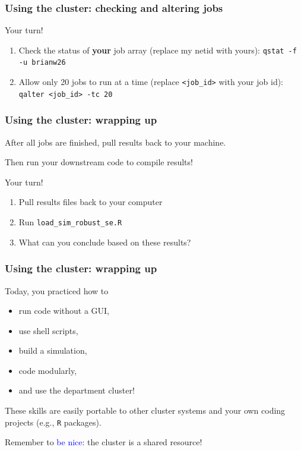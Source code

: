 \documentclass[12pt, 
hyperref={colorlinks=true, linkcolor=BlueViolet, urlcolor=BlueViolet},dvipsnames]{beamer}
\begin{document}
\begin{frame}
\frametitle{Using the cluster: checking and altering jobs}

Your turn!

\begin{enumerate}
\item Check the status of \textbf{your} job array (replace my netid with yours): \texttt{qstat -f -u brianw26}
\item Allow only 20 jobs to run at a time (replace \texttt{<job\_id>} with your job id): \texttt{qalter <job\_id> -tc 20}
\end{enumerate}
\end{frame}

\begin{frame}
\frametitle{Using the cluster: wrapping up}
After all jobs are finished, pull results back to your machine. \pause

Then run your downstream code to compile results! \pause

Your turn! \vspace{-0.3cm}
\begin{enumerate}
\item Pull results files back to your computer
\item Run \texttt{load\_sim\_robust\_se.R}
\item What can you conclude based on these results?
\end{enumerate}
\end{frame}

\begin{frame}
\frametitle{Using the cluster: wrapping up}
Today, you practiced how to \vspace{-0.3cm} \pause
\begin{itemize}
\item run code without a GUI, \pause
\item use shell scripts, \pause
\item build a simulation, \pause
\item code modularly, \pause
\item and use the department cluster! \pause
\end{itemize}

These skills are easily portable to other cluster systems and your own coding projects (e.g., \texttt{R} packages). \pause

Remember to \textcolor{blue}{be nice}: the cluster is a shared resource!

\end{frame}
\end{document}
